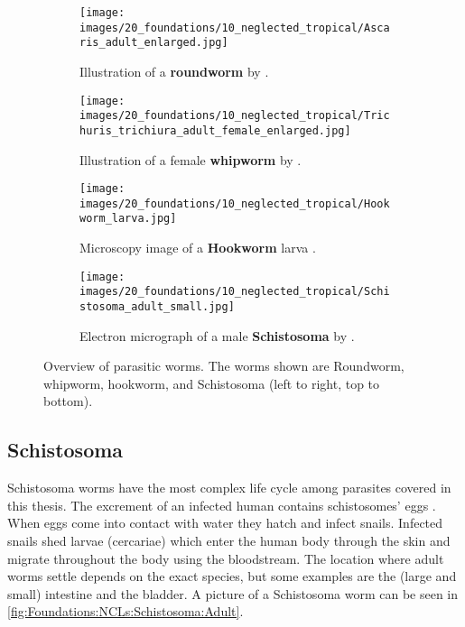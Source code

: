 \begin{figure}
    \begin{subfigure}[t]{0.45\textwidth}
        \centering
        \texttt{[image: images/20\_foundations/10\_neglected\_tropical/Ascaris\_adult\_enlarged.jpg]}
        \caption{Illustration of a \textbf{roundworm} by \textcite{blainville1824traite}.}
        \label{fig:Foundations:NCLs:STHs:Ascaris}
        \vspace*{2mm}
    \end{subfigure}
    \hfill
    \begin{subfigure}[t]{0.45\textwidth}
        \centering
        \texttt{[image: images/20\_foundations/10\_neglected\_tropical/Trichuris\_trichiura\_adult\_female\_enlarged.jpg]}
        \caption{Illustration of a female \textbf{whipworm} by \textcite{blainville1824traite}.}
        \label{fig:Foundations:NCLs:STHs:Whipworm:Adult}
        \vspace*{2mm}
    \end{subfigure}
    \begin{subfigure}[t]{0.45\textwidth}
        \centering
        \texttt{[image: images/20\_foundations/10\_neglected\_tropical/Hookworm\_larva.jpg]}
        \caption{Microscopy image of a \textbf{Hookworm} larva \cite{dpdx2019hookworm}.}
        \label{fig:Foundations:NCLs:STHs:Hookworm:Adult}
    \end{subfigure}    
    \hfill
    \begin{subfigure}[t]{0.45\textwidth}
        \centering
        \texttt{[image: images/20\_foundations/10\_neglected\_tropical/Schistosoma\_adult\_small.jpg]}
        \caption{Electron micrograph of a male \textbf{Schistosoma} by \textcite{davidwilliams2009schistosoma}.}
        \label{fig:Foundations:NCLs:Schistosoma:Adult}
    \end{subfigure}
    \caption[Parasitic worm overview]{Overview of parasitic worms. The worms shown are Roundworm, whipworm, hookworm, and Schistosoma (left to right, top to bottom).}
    \label{fig:Foundations:NCLs:Overview}
\end{figure}


\subsection{Schistosoma}
\label{sec:Foundations:NTDs:STHs:Schistosoma}

Schistosoma worms have the most complex life cycle among parasites covered in this thesis. The excrement of an infected human contains schistosomes' eggs \cite{nelwan2019schistosomiasis}. When eggs come into contact with water they hatch and infect snails. Infected snails shed larvae (cercariae) which enter the human body through the skin and migrate throughout the body using the bloodstream. The location where adult worms settle depends on the exact species, but some examples are the (large and small) intestine and the bladder. A picture of a Schistosoma worm can be seen in \autoref{fig:Foundations:NCLs:Schistosoma:Adult}.

